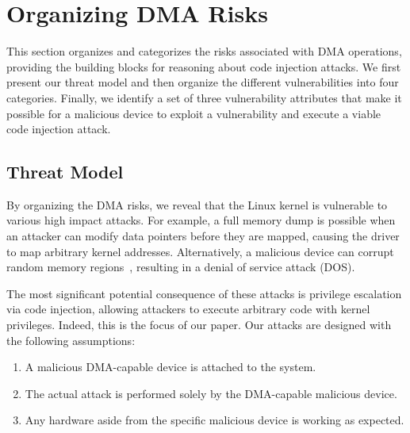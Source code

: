 
\section{Organizing DMA Risks}\label{sec:dma-risks}
This section organizes and categorizes the risks associated with DMA operations, providing the building blocks for reasoning about code injection attacks.
We first present our threat model and then organize the different \subpage{} vulnerabilities into four categories.
Finally, we identify a set of three vulnerability attributes that make it possible for a malicious device to exploit a \subpage{} vulnerability and execute a viable code injection attack.

\subsection{Threat Model}\label{sec:threat_model}
By organizing the DMA risks, we reveal that the Linux kernel is vulnerable to various high impact attacks.
For example, a full memory dump is possible when an attacker can modify data pointers before they are mapped, causing the driver to map arbitrary kernel addresses.
Alternatively, a malicious device can corrupt random memory regions~\cite{MMT16}, resulting in a denial of service attack (DOS).


The most significant potential consequence of these attacks is privilege escalation via code injection, allowing attackers to execute arbitrary code with kernel privileges. Indeed, this is the focus of our paper. 
Our attacks are designed with the following assumptions:
\begin{enumerate}
    \item A malicious DMA-capable device is attached to the system.
    \item The actual attack is performed solely by the DMA-capable malicious device.
    \item Any hardware aside from the specific malicious device is working as expected.
 \end{enumerate}


